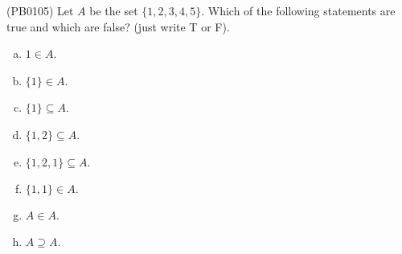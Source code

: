 \item (PB0105) Let $A$ be the set $\{1,2,3,4,5\}$. Which of the following statements are true and which are false? (just write T or F).
\begin{multicols}{2}
\begin{enumerate}[(a)]
\item $1\in A$. 
\item $\{1\}\in A$.
\item $\{1\}\subseteq A$.
\item $\{1,2\}\subseteq A$.
\item $\{1,2,1\}\subseteq A.$
\item $\{1,1\}\in A.$
\item $A\in A$.
\item $A\supseteq A$.
\end{enumerate}
\end{multicols}
